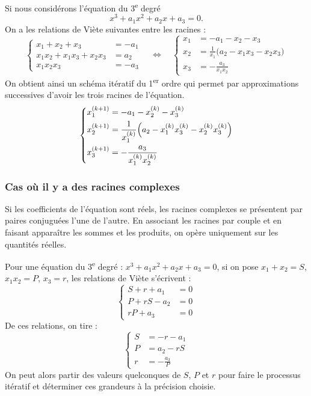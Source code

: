 Si nous considérons l'équation du 3\textsuperscript{e} degré
\[
  x^3 + a_1x^2 + a_2x + a_3 = 0 .
\]
On a les relations de Viète suivantes entre les racines :
\[
  \left\{
  \begin{aligned}
    x_1 + x_2 + x_3 &= -a_1\\
    x_1x_2 + x_1x_3 + x_2x_3 &= a_2\\
    x_1x_2x_3 &= -a_3
  \end{aligned}
  \right.
  \quad\Longleftrightarrow\quad
  \left\{
  \begin{aligned}
    x_1 &= -a_1 - x_2 - x_3\\
    x_2 &= \frac{1}{x_1}\bigl(a_2 - x_1x_3 - x_2x_3\bigr)\\
    x_3 &= -\frac{a_3}{x_1x_2}
  \end{aligned}
  \right.
\]
On obtient ainsi un schéma itératif du 1\textsuperscript{er} ordre qui permet
par approximations successives d'avoir les trois racines de l'équation.
\[
  \left\{
  \begin{aligned}
    x_1^{(k+1)} &= -a_1 - x_2^{(k)} - x_3^{(k)}\\
    x_2^{(k+1)} &= \frac{1}{x_1^{(k)}}\Bigl(a_2 - x_1^{(k)}x_3^{(k)} - x_2^{(k)}x_3^{(k)}\Bigr)\\
    x_3^{(k+1)} &= -\frac{a_3}{x_1^{(k)}x_2^{(k)}}
  \end{aligned}
  \right.
\]

\subsubsection{Cas où il y a des racines complexes}

Si les coefficients de l'équation sont réels, les racines complexes se
présentent par paires conjuguées l'une de l'autre. En associant les racines
par couple et en faisant apparaître les sommes et les produits, on opère
uniquement sur les quantités réelles.

Pour une équation du 3\textsuperscript{e} degré :
$x^3 + a_1x^2 + a_2x + a_3 = 0$, si on pose $x_1 + x_2 = S$, $x_1x_2 = P$,
$x_3 = r$, les relations de Viète s'écrivent :
\[
  \left\{
  \begin{aligned}
    S + r + a_1 &= 0\\
    P + rS - a_2 &= 0\\
    rP + a_3 &= 0
  \end{aligned}
  \right.
\]
De ces relations, on tire :
\[
  \left\{
  \begin{aligned}
    S &= -r - a_1\\
    P &= a_2 - rS\\
    r &= -\frac{a_3}{P}
  \end{aligned}
  \right.
\]
On peut alors partir des valeurs quelconques de $S$, $P$ et $r$ pour faire le
processus itératif et déterminer ces grandeurs à la précision choisie.

